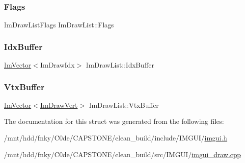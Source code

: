 \mbox{\label{structImDrawList_ada2c004661663ef875f4d4c7ec0b4557}} 
\subsubsection{\texorpdfstring{Flags}{Flags}}
{\footnotesize\ttfamily Im\+Draw\+List\+Flags Im\+Draw\+List\+::\+Flags}

\mbox{\label{structImDrawList_adf292ff70a954d82daf061c609e75dfc}} 
\subsubsection{\texorpdfstring{Idx\+Buffer}{IdxBuffer}}
{\footnotesize\ttfamily \hyperlink{structImVector}{Im\+Vector}$<$Im\+Draw\+Idx$>$ Im\+Draw\+List\+::\+Idx\+Buffer}

\mbox{\label{structImDrawList_aa8ff4aee39cf3c3791b7e29a7b4264be}} 
\subsubsection{\texorpdfstring{Vtx\+Buffer}{VtxBuffer}}
{\footnotesize\ttfamily \hyperlink{structImVector}{Im\+Vector}$<$\hyperlink{structImDrawVert}{Im\+Draw\+Vert}$>$ Im\+Draw\+List\+::\+Vtx\+Buffer}



The documentation for this struct was generated from the following files\+:\begin{DoxyCompactItemize}
\item 
/mnt/hdd/fnky/\+C0de/\+C\+A\+P\+S\+T\+O\+N\+E/clean\+\_\+build/include/\+I\+M\+G\+U\+I/\hyperlink{imgui_8h}{imgui.\+h}\item 
/mnt/hdd/fnky/\+C0de/\+C\+A\+P\+S\+T\+O\+N\+E/clean\+\_\+build/src/\+I\+M\+G\+U\+I/\hyperlink{imgui__draw_8cpp}{imgui\+\_\+draw.\+cpp}\end{DoxyCompactItemize}
